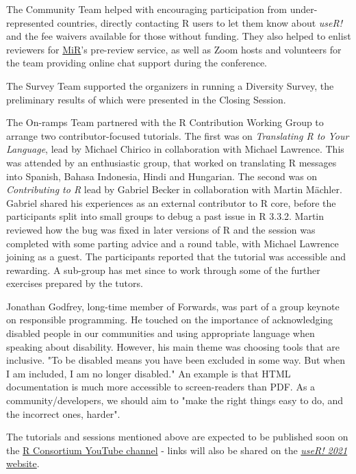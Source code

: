 The Community Team helped with encouraging participation from under-represented countries, directly contacting R users to let them know about \emph{useR!} and the fee waivers available for those without funding. They also helped to enlist reviewers for \href{https://mircommunity.com/}{MiR}'s pre-review service, as well as Zoom hosts and volunteers for the team providing online chat support during the conference.

The Survey Team supported the organizers in running a Diversity Survey, the preliminary results of which were presented in the Closing Session.

The On-ramps Team partnered with the R Contribution Working Group to arrange two contributor-focused tutorials. The first was on \emph{Translating R to Your Language}, lead by Michael Chirico in collaboration with Michael Lawrence. This was attended by an enthusiastic group, that worked on translating R messages into Spanish, Bahasa Indonesia, Hindi and Hungarian. The second was on \emph{Contributing to R} lead by Gabriel Becker in collaboration with Martin Mächler. Gabriel shared his experiences as an external contributor to R core, before the participants split into small groups to debug a past issue in R 3.3.2. Martin reviewed how the bug was fixed in later versions of R and the session was completed with some parting advice and a round table, with Michael Lawrence joining as a guest. The participants reported that the tutorial was accessible and rewarding. A sub-group has met since to work through some of the further exercises prepared by the tutors.

Jonathan Godfrey, long-time member of Forwards, was part of a group keynote on responsible programming. He touched on the importance of acknowledging disabled people in our communities and using appropriate language when speaking about disability. However, his main theme was choosing tools that are inclusive. "To be disabled means you have been excluded in some way. But when I am included, I am no longer disabled." An example is that HTML documentation is much more accessible to screen-readers than PDF. As a community/developers, we should aim to "make the right things easy to do, and the incorrect ones, harder". 

The tutorials and sessions mentioned above are expected to be published soon on the \href{https://www.youtube.com/channel/UC_R5smHVXRYGhZYDJsnXTwg}{R Consortium YouTube channel} - links will also be shared on the \href{https://user2021.r-project.org/}{\emph{useR! 2021} website}.

